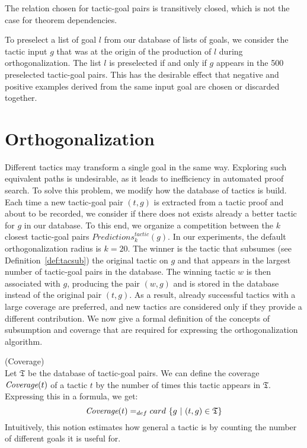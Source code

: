 \documentclass[runningheads,a4paper,draft]{svjour3}
\begin{document}
\begin{remark}
The relation chosen for tactic-goal pairs is transitively closed, which is not 
the case for theorem dependencies.
\end{remark}

To preselect a list of goal $l$ from our database of lists of goals, we 
consider the tactic input $g$ that was at the origin of the production of $l$ 
during orthogonalization. The list $l$ 
is preselected if and only if $g$ appears in the 500 preselected tactic-goal 
pairs. This has the
desirable effect that negative and positive examples derived from the same
input goal are chosen or discarded together.

\section{Orthogonalization}\label{sec:ortho}
Different tactics may transform a single goal in the same way. Exploring such
equivalent paths
is undesirable, as it leads to inefficiency in automated proof search.
To solve this problem, we modify how the database of tactics is build.
Each time a new tactic-goal pair $(t,g)$ is extracted from a tactic proof and 
about to be recorded, we consider if there does not exists already a better 
tactic for $g$ in our database. To this end, we organize a competition between 
the 
$k$ closest tactic-goal pairs $\mathit{Predictions}^{\mathit{tactic}}_k(g)$. 
In our experiments, 
the default orthogonalization radius is $k=20$.
The winner is the tactic that subsumes (see Definition~\ref{def:tacsub}) the 
original tactic on $g$ and that
appears in the largest number of tactic-goal pairs in the database.
The winning tactic $w$ is then associated with $g$, producing the pair $(w,g)$
and is stored in the database instead of the original pair $(t,g)$. 
As a result, already successful tactics with a large coverage are preferred, 
and new tactics are considered only if they provide a different contribution. 
We now give a formal definition of the concepts of subsumption and coverage 
that are required for expressing the orthogonalization algorithm.

\begin{definition} (Coverage)\\
Let $\mathfrak{T}$ be the database of tactic-goal pairs. We can define the
coverage $\textit{\mbox{Coverage}}(t)$ of a tactic $t$ by the number of times
this tactic
appears in
$\mathfrak{T}$. Expressing this in a formula, we get:
  \[\textit{\mbox{Coverage}}(t) =_{def} card\ \lbrace g\ |\ (t,g) \in 
  \mathfrak{T} \rbrace \]
Intuitively, this notion estimates how general a tactic is by counting the
number of different goals it is useful for.
\end{definition}
\end{document}
